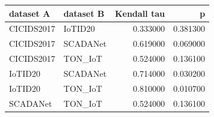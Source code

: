 \begin{tabular}{llrr}
\toprule
dataset A & dataset B & Kendall tau & p \\
\midrule
CICIDS2017 & IoTID20 & 0.333000 & 0.381300 \\
CICIDS2017 & SCADANet & 0.619000 & 0.069000 \\
CICIDS2017 & TON\_IoT & 0.524000 & 0.136100 \\
IoTID20 & SCADANet & 0.714000 & 0.030200 \\
IoTID20 & TON\_IoT & 0.810000 & 0.010700 \\
SCADANet & TON\_IoT & 0.524000 & 0.136100 \\
\bottomrule
\end{tabular}
